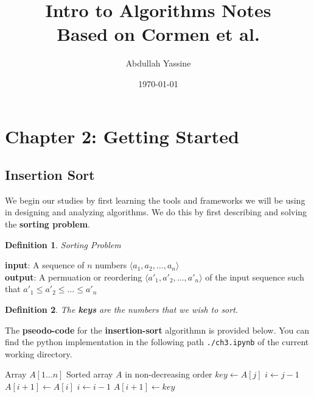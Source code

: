 \documentclass[12pt]{article}
\title{\textbf{Intro to Algorithms Notes}\\[1ex]\large Based on Cormen et al.}
\author{Abdullah Yassine}
\date{\today}
\newtheorem{definition}{Definition}[section]
\newenvironment{examplebox}[1][]{ %
  \begin{tcolorbox}[exampleboxstyle,#1] %
}{
  \end{tcolorbox}
}
\begin{document}
\maketitle
\tableofcontents
\newpage

\setcounter{section}{1}
\section{Chapter 2: Getting Started}

\subsection{Insertion Sort}
We begin our studies by first learning the tools and frameworks we will be using in designing and analyzing algorithms. We do this by first describing and solving the \textbf{sorting problem}.

\begin{definition}
    Sorting Problem
\end{definition}
\begin{examplebox}[title=Sorting Problem Definition]
\textbf{input}: A sequence of $n$ numbers $\langle a_1,a_2,\ldots, a_n \rangle$ \\
\textbf{output}: A permuation or reordering $\langle a'_1,a'_2, \dots,a'_n \rangle$ of the input sequence such that \mbox{$a'_1 \leq a'_2 \leq \ldots \leq a'_n $}
\end{examplebox}


\begin{definition}
  The \textbf{keys} are the numbers that we wish to sort.
\end{definition}

The \textbf{pseodo-code} for the \textbf{insertion-sort} algorithmn is provided below. You can find the python implementation in the following path \texttt{./ch3.ipynb} of the current working directory.

\begin{algorithm}[H]
\caption{\textsc{Insertion-Sort}$(A)$}
\begin{algorithmic}[1]
\Require Array $A[1 \ldots n]$
\Ensure Sorted array $A$ in non-decreasing order
  \State $key \gets A[j]$
  \State $i \gets j - 1$
    \State $A[i + 1] \gets A[i]$ 
    \State $i \gets i - 1$
  \EndWhile
  \State $A[i + 1] \gets key$ 
\EndFor
\end{algorithmic}
\end{algorithm}
\end{document}
